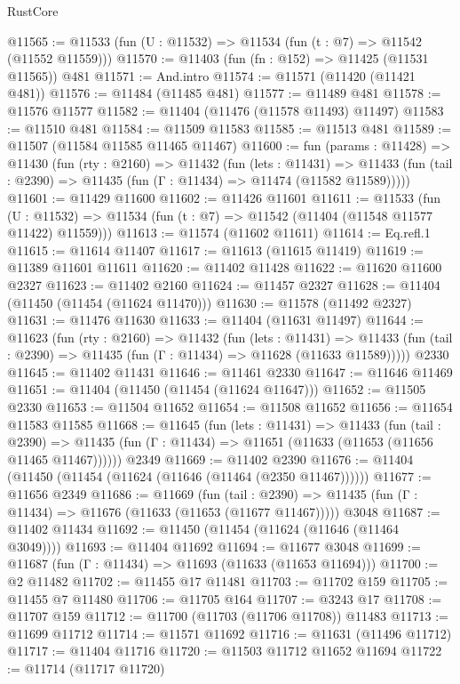 \begin{lexlean}{RustCore}
\begin{coremodule}
@11565 := @11533 (fun (U : @11532) => @11534 (fun (t : @7) => @11542 (@11552 @11559)))
@11570 := @11403 (fun (fn : @152) => @11425 (@11531 @11565)) @481
@11571 := And.intro
@11574 := @11571 (@11420 (@11421 @481))
@11576 := @11484 (@11485 @481)
@11577 := @11489 @481
@11578 := @11576 @11577
@11582 := @11404 (@11476 (@11578 @11493) @11497)
@11583 := @11510 @481
@11584 := @11509 @11583
@11585 := @11513 @481
@11589 := @11507 (@11584 @11585 @11465 @11467)
@11600 := fun (params : @11428) =>
  @11430
    (fun (rty : @2160) =>
    @11432
      (fun (lets : @11431) =>
      @11433 (fun (tail : @2390) => @11435 (fun (Γ : @11434) => @11474 (@11582 @11589)))))
@11601 := @11429 @11600
@11602 := @11426 @11601
@11611 := @11533
    (fun (U : @11532) => @11534 (fun (t : @7) => @11542 (@11404 (@11548 @11577 @11422) @11559)))
@11613 := @11574 (@11602 @11611)
@11614 := Eq.refl.{1}
@11615 := @11614 @11407
@11617 := @11613 (@11615 @11419)
@11619 := @11389 @11601 @11611
@11620 := @11402 @11428
@11622 := @11620 @11600 @2327
@11623 := @11402 @2160
@11624 := @11457 @2327
@11628 := @11404 (@11450 (@11454 (@11624 @11470)))
@11630 := @11578 (@11492 @2327)
@11631 := @11476 @11630
@11633 := @11404 (@11631 @11497)
@11644 := @11623
    (fun (rty : @2160) =>
    @11432
      (fun (lets : @11431) =>
      @11433 (fun (tail : @2390) => @11435 (fun (Γ : @11434) => @11628 (@11633 @11589)))))
    @2330
@11645 := @11402 @11431
@11646 := @11461 @2330
@11647 := @11646 @11469
@11651 := @11404 (@11450 (@11454 (@11624 @11647)))
@11652 := @11505 @2330
@11653 := @11504 @11652
@11654 := @11508 @11652
@11656 := @11654 @11583 @11585
@11668 := @11645
    (fun (lets : @11431) =>
    @11433
      (fun (tail : @2390) =>
      @11435 (fun (Γ : @11434) => @11651 (@11633 (@11653 (@11656 @11465 @11467))))))
    @2349
@11669 := @11402 @2390
@11676 := @11404 (@11450 (@11454 (@11624 (@11646 (@11464 (@2350 @11467))))))
@11677 := @11656 @2349
@11686 := @11669
    (fun (tail : @2390) => @11435 (fun (Γ : @11434) => @11676 (@11633 (@11653 (@11677 @11467)))))
    @3048
@11687 := @11402 @11434
@11692 := @11450 (@11454 (@11624 (@11646 (@11464 @3049))))
@11693 := @11404 @11692
@11694 := @11677 @3048
@11699 := @11687 (fun (Γ : @11434) => @11693 (@11633 (@11653 @11694)))
@11700 := @2 @11482
@11702 := @11455 @17 @11481
@11703 := @11702 @159
@11705 := @11455 @7 @11480
@11706 := @11705 @164
@11707 := @3243 @17
@11708 := @11707 @159
@11712 := @11700 (@11703 (@11706 @11708)) @11483
@11713 := @11699 @11712
@11714 := @11571 @11692
@11716 := @11631 (@11496 @11712)
@11717 := @11404 @11716
@11720 := @11503 @11712 @11652 @11694
@11722 := @11714 (@11717 @11720)

\end{coremodule}
\end{lexlean}
